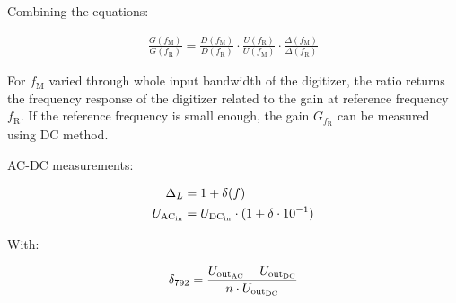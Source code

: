 \documentclass[a4paper, 12pt]{article}
\begin{document}
%
%
Combining the equations:

\begin{align}
	\frac{G(f_\text{M})}{G(f_\text{R})} = \frac{D(f_\text{M})}{D(f_\text{R})} \cdot \frac{U(f_\text{R})}{U(f_\text{M})} \cdot \frac{\Delta(f_\text{M})}{\Delta(f_\text{R})}
\end{align}


For $f_\text{M}$ varied through whole input bandwidth of the digitizer, the
ratio returns the frequency response of the digitizer related to the gain at
reference frequency $f_\text{R}$. If the reference frequency is small enough,
the gain $G_{f_\text{R}}$ can be measured using DC method.

\textcolor{red}{}

AC-DC measurements:

\begin{align}
	\Delta_L        & = 1 + \delta(f)                                    \\
	U_{\rm AC_{in}} & = U_{\rm DC_{in}} \cdot (1 + \delta \cdot 10^{-1})
\end{align}

With:

\begin{align}
	\delta_{792} = \frac{U_{\rm out_{AC}} - U_{\rm out_{DC}}}{n\cdot U_{\rm out_{DC}}}
\end{align}
\end{document}
